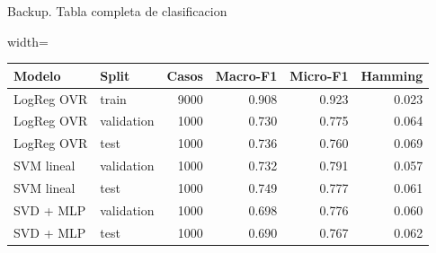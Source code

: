 \documentclass[aspectratio=169,10pt]{beamer}
\begin{document}
\appendix
\begin{frame}{Backup. Tabla completa de clasificacion}
  \begin{adjustbox}{width=\linewidth}
    \begin{tabular}{llrrrr}
      \toprule
      \textbf{Modelo} & \textbf{Split} & \textbf{Casos} & \textbf{Macro-F1} & \textbf{Micro-F1} & \textbf{Hamming}\\
      \midrule
      LogReg OVR & train & 9000 & 0.908 & 0.923 & 0.023\\
      LogReg OVR & validation & 1000 & 0.730 & 0.775 & 0.064\\
      LogReg OVR & test & 1000 & 0.736 & 0.760 & 0.069\\
      SVM lineal & validation & 1000 & 0.732 & 0.791 & 0.057\\
      \rowcolor{Mint}
      SVM lineal & test & 1000 & 0.749 & 0.777 & 0.061\\
      SVD + MLP & validation & 1000 & 0.698 & 0.776 & 0.060\\
      SVD + MLP & test & 1000 & 0.690 & 0.767 & 0.062\\
      \bottomrule
    \end{tabular}
  \end{adjustbox}
\end{frame}
\end{document}
